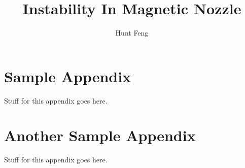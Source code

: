 \documentclass[subfigure]{uofsthesis-cs}
\title{Instability In Magnetic Nozzle}
\author{Hunt Feng}
\begin{document}
\maketitle
\tracingall

\frontmatter
















%

\uofsappendix

\begin{appendices}

\chapter{Sample Appendix}

Stuff for this appendix goes here.

\chapter{Another Sample Appendix}

Stuff for this appendix goes here.

\end{appendices}
\end{document}
